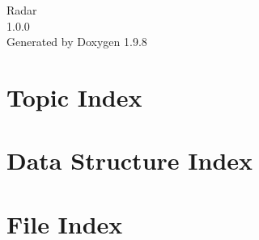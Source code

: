 \documentclass[twoside]{book}
\newcommand{\+}{\discretionary{\mbox{\scriptsize$\hookleftarrow$}}{}{}}
\newcommand{\clearemptydoublepage}{%
    \newpage{\pagestyle{empty}\cleardoublepage}%
  }
\begin{document}
  \raggedbottom
    \hypersetup{pageanchor=false,
                bookmarksnumbered=true,
                pdfencoding=unicode
               }
  \begin{titlepage}
  \vspace*{7cm}
  \begin{center}%
  {\Large Radar}\\
  [1ex]\large 1.\+0.\+0 \\
  \vspace*{1cm}
  {\large Generated by Doxygen 1.9.8}\\
  \end{center}
  \end{titlepage}
  \clearemptydoublepage
  \tableofcontents
  \clearemptydoublepage
  \hypersetup{pageanchor=true}



\chapter{Topic Index}

\chapter{Data Structure Index}

\chapter{File Index}

\end{document}
